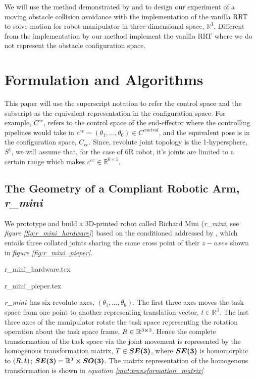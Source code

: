 \documentclass[a4paper, 10pt]{article}
\newcommand\thisPaperDir{/home/asl/version-control/ws_thesis/writing_papers/resampling_planning_in_dynamic_environment}
\numberwithin{equation}{section} %
\newcommand\rimini[0]{\textit{r\_mini}} %
\begin{document}
We will use the method demonstrated by \textcite{Kunz2010a} and
\textcite{Wei2018}
to design our experiment of a moving obstacle collision avoidance with
the implementation of the vanilla RRT to solve motion for robot
manipulator in three-dimensional space, $\mathbb{R}^3$. Different
from the implementation by \textcite{Wei2018} our method
implement the vanilla
RRT where we do not represent the obstacle configuration space.

\section{Formulation and Algorithms}

This paper
will use the superscript notation to refer the control space and the 
subscript as the equivalent representation in the configuration space.
For example, $C^{ee}$, refers to the control space of the end-effector
where the controlling pipelines would take in
$c^{ee} = (\theta_{1},\ldots,\theta_{6}) \in C^{control}$, 
and the equivalent pose is in the configuration space, $C_{ee}$. Since, 
revolute joint topology is the 1-hypersphere, $S^1$, we will
assume that, for the case of 6R robot,
it's joints are limited to a certain range which makes $c^{ee} \in \mathbb{R}^{6\times1}$.

\subsection{The Geometry of a Compliant Robotic Arm, \rimini}

We prototype and build a 3D-printed robot called 
Richard Mini (\rimini, see \textit{figure \ref{fig:r_mini_hardware}}) 
based
on the conditioned addressed by \textcite{Pieper1968}, which 
entails three collated joints sharing the same cross 
point of their $z-axes$ shown in \textit{figure \ref{fig:r_mini_pieper}}. 

{r_mini_hardware.tex}

{r_mini_pieper.tex}

\rimini~has six revolute axes,
$(\theta_1,\ldots, \theta_6)$. The
first three axes moves the task space from one point to another
representing translation vector, $t \in \mathbb{R}^3$. 
The last three axes of 
the manipulator rotate the task space representing the
rotation operation about the task space frame, $R \in \mathbb{R}^{3\cross3}$. 
Hence 
the complete transformation of the task space via
the joint movement is represented by the homogenous 
transformation matrix, $T \in \vb*{SE(3)}$, where 
$\vb*{SE(3)}$ is homomorphic to $(R,\vb*{t})$; 
$\vb*{SE(3)} = \mathbb{R}^3  \cross \vb*{SO(3)}$.
The matrix representation of the homogenous transformation 
is shown in \textit{equation \ref{mat:transformation_matrix}}
\end{document}
